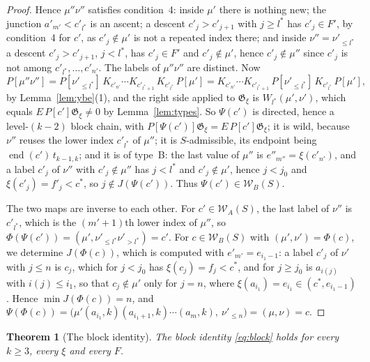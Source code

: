\documentclass[11pt]{article}
\newtheorem{theorem}[proposition]{Theorem}
\newcommand{\G}{\mathfrak{G}}
\begin{document}
\begin{proof}
Hence $\mu''\nu''$ satisfies condition~4: inside $\mu'$ there is
nothing new; the junction $a'_{m'}<c'_{l^\ast}$ is an ascent; a descent
$c'_j>c'_{j+1}$ with $j\geq l^\ast$ has $c'_j\in F'$, by condition~4
for $c'$, as $c'_j\notin\mu'$ is not a repeated index there; and
inside $\nu''=\nu'_{\leq l^\ast}$ a descent $c'_j>c'_{j+1}$, $j<l^\ast$,
has $c'_j\in F'$ and $c'_j\notin\mu'$, hence $c'_j\notin\mu''$ since
$c'_j$ is not among $c'_{l^\ast},\ldots,c'_{n'}$. The labels of
$\mu''\nu''$ are distinct. Now
\[
 P[\mu''\nu'']=P[\nu'_{\leq l^\ast}]\,K_{c'_{n'}}\cdots K_{c'_{l^\ast+1}}\,K_{c'_{l^\ast}}\,P[\mu']
 =K_{c'_{n'}}\cdots K_{c'_{l^\ast+1}}\,P[\nu'_{\leq l^\ast}]\,K_{c'_{l^\ast}}\,P[\mu'] ,
\]
by Lemma~\ref{lem:ybe}(1), and the right side applied to $\G_\xi$ is
$W_{l^\ast}(\mu',\nu')$, which equals $E\,P[c']\G_\xi\neq0$ by
Lemma~\ref{lem:types}. So $\Psi(c')$ is directed, hence a level-$(k-2)$
block chain, with $P[\Psi(c')]\G_\xi=E\,P[c']\G_\xi$; it is wild,
because $\nu''$ reuses the lower index $c'_{l^\ast}$ of $\mu''$; it is
$S$-admissible, its endpoint being
$\operatorname{end}(c')\,t_{k-1,k}$; and it is of type~B: the last
value of $\mu''$ is $e''_{m''}=\xi(c'_{n'})$, and a label $c'_j$ of
$\nu''$ with $c'_j\notin\mu''$ has $j<l^\ast$ and $c'_j\notin\mu'$,
hence $j<j_0$ and $\xi(c'_j)=f'_j<c^\ast$, so $j\notin J(\Psi(c'))$.
Thus $\Psi(c')\in\mathcal W_B(S)$.

The two maps are inverse to each other. For $c'\in\mathcal W_A(S)$,
the last label of $\nu''$ is $c'_{l^\ast}$, which is the $(m'+1)$th
lower index of $\mu''$, so $\Phi(\Psi(c'))=(\mu',\nu'_{\leq l^\ast}\nu'_{>l^\ast})=c'$.
For $c\in\mathcal W_B(S)$ with $(\mu',\nu')=\Phi(c)$, we determine
$J(\Phi(c))$, which is computed with $e'_{m'}=e_{i_1-1}$: a label
$c'_j$ of $\nu'$ with $j\leq n$ is $c_j$, which for $j<j_0$ has
$\xi(c_j)=f_j<c^\ast$, and for $j\geq j_0$ is $a_{i(j)}$ with
$i(j)\leq i_1$, so that $c_j\notin\mu'$ only for $j=n$, where
$\xi(a_{i_1})=e_{i_1}\in(c^\ast,e_{i_1-1})$. Hence $\min J(\Phi(c))=n$,
and $\Psi(\Phi(c))=\bigl(\mu'(a_{i_1},k)(a_{i_1+1},k)\cdots(a_m,k),\ \nu'_{\leq n}\bigr)=(\mu,\nu)=c$.
\end{proof}

\begin{theorem}[The block identity]\label{thm:block}
The block identity \eqref{eq:block} holds for every $k\geq3$, every
$\xi$ and every $F$.
\end{theorem}
\end{document}
